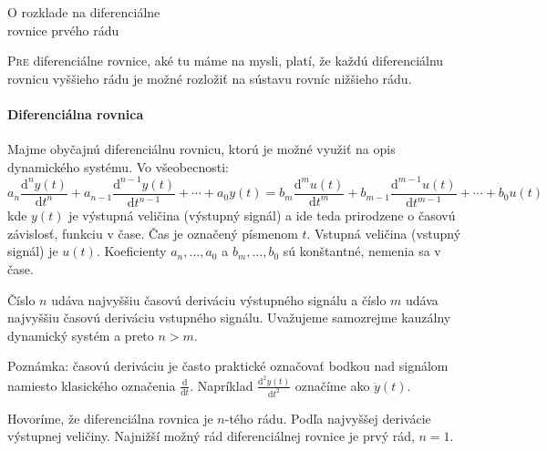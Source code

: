 \documentclass[a4paper, 10pt, ]{article}
\begin{document}
\begin{flushleft}
	O rozklade na diferenciálne \\rovnice prvého rádu
\end{flushleft}

\bigskip

\normalsize
\normalfont










\noindent
\lettrine[lines=1, nindent=1pt, loversize=0.0]{P}{re} 
diferenciálne rovnice, aké tu máme na mysli, platí, že každú diferenciálnu rovnicu vyššieho rádu je možné rozložiť na sústavu rovníc nižšieho rádu.



\paragraph{Diferenciálna rovnica}

Majme obyčajnú diferenciálnu rovnicu, ktorú je možné využiť na opis dynamického systému. Vo všeobecnosti:
\begin{equation}
    a_n \frac{\text{d}^n y(t)}{\text{d}t^n} 
    + a_{n-1} \frac{\text{d}^{n-1} y(t)}{\text{d}t^{n-1}}
    +
    \cdots
    +
    a_0 y(t)
    =
    b_m \frac{\text{d}^m u(t)}{\text{d}t^m} 
    + b_{m-1} \frac{\text{d}^{m-1} u(t)}{\text{d}t^{m-1}}
    +
    \cdots
    +
    b_0 u(t)
\end{equation}
kde $y(t)$ je výstupná veličina (výstupný signál) a ide teda prirodzene o časovú závislosť, funkciu v čase. Čas je označený písmenom $t$. Vstupná veličina (vstupný signál) je $u(t)$. Koeficienty $a_n, \ldots, a_0$ a $b_m, \ldots, b_0$ sú konštantné, nemenia sa v čase.

Číslo $n$ udáva najvyššiu časovú deriváciu výstupného signálu a číslo $m$ udáva najvyššiu časovú deriváciu vstupného signálu. Uvažujeme samozrejme kauzálny dynamický systém a preto $n>m$.

Poznámka: časovú deriváciu je často praktické označovať bodkou nad signálom namiesto klasického označenia $\frac{\text{d}}{\text{d}t}$. Napríklad $\frac{\text{d}^2 y(t)}{\text{d}t^2}$ označíme ako $\ddot y(t)$.

Hovoríme, že diferenciálna rovnica je $n$-tého rádu. Podľa najvyššej derivácie výstupnej veličiny. Najnižší možný rád diferenciálnej rovnice je prvý rád, $n=1$.
\end{document}
